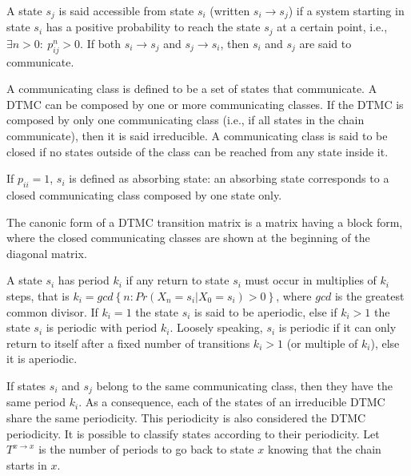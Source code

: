 \documentclass[article,nojss]{jss}
\begin{document}
A state \(s_{j}\) is said accessible from state \(s_{i}\) (written \(s_{i}\rightarrow s_{j}\)) if a system starting in state \(s_{i}\) has a positive probability to reach the state \(s_{j}\) at a certain point, i.e., \(\exists n>0:\: p_{ij}^{n}>0\). If both \(s_{i}\rightarrow s_{j}\) and \(s_{j}\rightarrow s_{i}\), then
\(s_{i}\) and \(s_{j}\) are said to communicate.

A communicating class is defined to be a set of states that communicate. A DTMC can be composed by one or more communicating classes. If the DTMC is composed by only one communicating class (i.e., if all states in the chain communicate), then it is said irreducible. A communicating class is said to be closed if no states outside of the class can be reached from any state inside it.

If \(p_{ii}=1\), \(s_{i}\) is defined as absorbing state: an absorbing state corresponds to a closed communicating class composed by one state only.

The canonic form of a DTMC transition matrix is a matrix having a block form, where the closed communicating classes are shown at the beginning of the diagonal matrix.

A state \(s_{i}\) has period \(k_{i}\) if any return to state \(s_{i}\) must occur in multiplies of \(k_{i}\) steps, that is \(k_{i}=gcd\left\{ n:Pr\left(X_{n}=s_{i}\left|X_{0}=s_{i}\right.\right)>0\right\}\), where \(gcd\) is the greatest common divisor. If \(k_{i}=1\) the state \(s_{i}\) is said to be aperiodic, else if \(k_{i}>1\) the state \(s_{i}\) is periodic with period \(k_{i}\). Loosely speaking, \(s_{i}\) is periodic if it can only return to itself after a fixed number of transitions \(k_{i}>1\) (or multiple of \(k_{i}\)), else it is aperiodic.

If states \(s_{i}\) and \(s_{j}\) belong to the same communicating class, then they have the same period \(k_{i}\). As a consequence, each of the states of an irreducible DTMC share the same periodicity. This periodicity is also considered the DTMC periodicity. It is possible to classify states according to their periodicity. Let \(T^{x\rightarrow x}\) is the number of periods to go back to state \(x\) knowing that the chain starts in \(x\).
\end{document}
